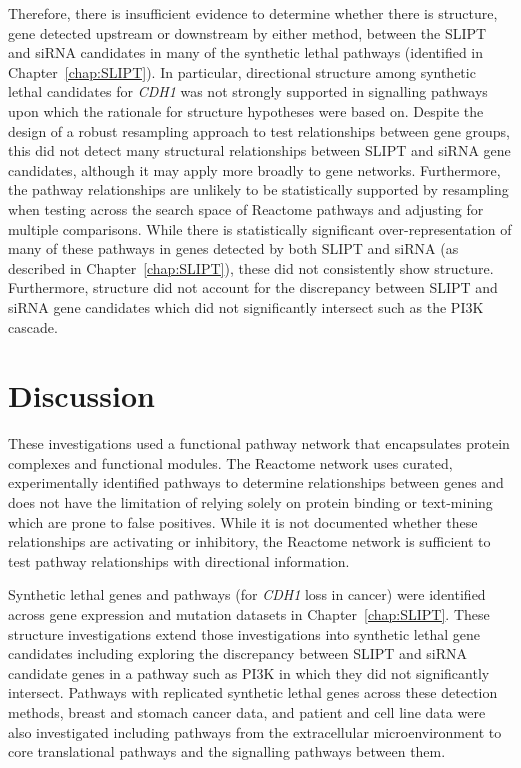 
Therefore, there is insufficient evidence to determine whether there is  structure, gene detected upstream or downstream by either method, between the \gls{SLIPT} and \gls{siRNA} candidates in many of the \gls{synthetic lethal} \glspl{pathway} (identified in Chapter~\ref{chap:SLIPT}). In particular, directional structure among \gls{synthetic lethal} candidates for \textit{CDH1} was not strongly supported in signalling \glspl{pathway} upon which the rationale for  structure hypotheses were based on. Despite the design of a robust resampling approach to test relationships between gene groups, this did not detect many structural relationships between \gls{SLIPT} and \gls{siRNA} gene candidates, although it may apply more broadly to gene networks. Furthermore, the \gls{pathway} relationships are unlikely to be statistically supported by resampling when testing across the search space of Reactome \glspl{pathway} and adjusting for multiple comparisons. While there is statistically significant over-representation of many of these \glspl{pathway} in genes detected by both \gls{SLIPT} and \gls{siRNA} (as described in Chapter~\ref{chap:SLIPT}), these did not consistently show  structure. Furthermore,  structure did not account for the discrepancy between \gls{SLIPT} and \gls{siRNA} gene candidates which did not significantly intersect such as the \gls{PI3K} cascade. 


\FloatBarrier

\section{Discussion}

These investigations used a functional \gls{pathway} network that encapsulates protein complexes and functional modules. The Reactome network \citep{Reactome} uses curated, experimentally identified \glspl{pathway} to determine relationships between genes and does not have the limitation of relying solely on protein binding or text-mining which are prone to false positives. While it is not documented whether these relationships are activating or inhibitory, the Reactome network \citep{Reactome} is sufficient to test \gls{pathway} relationships with directional information.

Synthetic lethal genes and \glspl{pathway} (for \textit{CDH1} loss in cancer) were identified across \gls{gene expression} and \gls{mutation} datasets in Chapter~\ref{chap:SLIPT}.
These  structure investigations extend those investigations into \gls{synthetic lethal} gene candidates including exploring the discrepancy between \gls{SLIPT} and \gls{siRNA} candidate genes in a \gls{pathway} such as \gls{PI3K} in which they did not significantly intersect.
%
Pathways with replicated \gls{synthetic lethal} genes across these detection methods, breast and stomach cancer data, and patient and cell line data were also investigated including \glspl{pathway} from the extracellular microenvironment to core translational \glspl{pathway} and the signalling \glspl{pathway} between them.

